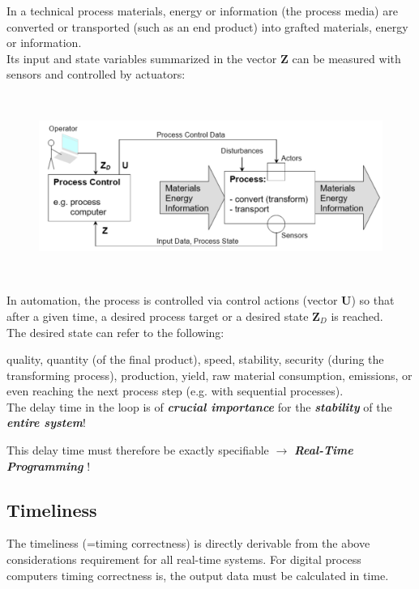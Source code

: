 In a technical process materials, energy or information (the process media) are converted or transported (such as an end product) into grafted materials, energy or information. \\

Its input and state variables summarized in the vector \textbf{Z} can be measured with sensors and controlled by actuators: \\

\begin{figure}[h]
    \centering
    \includegraphics[width=14cm, height=6cm]{Images/image60.png}
    \label{fig:Fig 6}
\end{figure}

In automation, the process is controlled via control actions (vector \textbf{U}) so that after a given time, a desired process target or a desired state \textbf{Z\textit{${}_{D}$}} is reached. \\

The desired state can refer to the following:

quality, quantity (of the final product), speed, stability, security (during the transforming process), production, yield, raw material consumption, emissions, or even reaching the next process step (e.g. with sequential processes).\\

The delay time in the loop is of \textbf{\textit{crucial importance}} for the \textbf{\textit{stability}} of the \textbf{\textit{entire system}}!

This delay time must therefore be exactly specifiable $\rightarrow$ \textbf{\textit{Real-Time Programming}} !

\subsection{Timeliness}

The timeliness (=timing correctness) is directly derivable from the above considerations requirement for all real-time systems. For digital process computers timing correctness is, the output data must be calculated in time.\\

